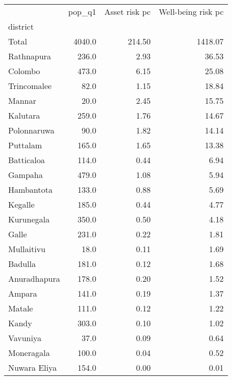 \begin{tabular}{lrrr}
\toprule
{} &  pop\_q1 &  Asset risk pc &  Well-being risk pc \\
district     &         &                &                     \\
\midrule
Total        &  4040.0 &         214.50 &             1418.07 \\
Rathnapura   &   236.0 &           2.93 &               36.53 \\
Colombo      &   473.0 &           6.15 &               25.08 \\
Trincomalee  &    82.0 &           1.15 &               18.84 \\
Mannar       &    20.0 &           2.45 &               15.75 \\
Kalutara     &   259.0 &           1.76 &               14.67 \\
Polonnaruwa  &    90.0 &           1.82 &               14.14 \\
Puttalam     &   165.0 &           1.65 &               13.38 \\
Batticaloa   &   114.0 &           0.44 &                6.94 \\
Gampaha      &   479.0 &           1.08 &                5.94 \\
Hambantota   &   133.0 &           0.88 &                5.69 \\
Kegalle      &   185.0 &           0.44 &                4.77 \\
Kurunegala   &   350.0 &           0.50 &                4.18 \\
Galle        &   231.0 &           0.22 &                1.81 \\
Mullaitivu   &    18.0 &           0.11 &                1.69 \\
Badulla      &   181.0 &           0.12 &                1.68 \\
Anuradhapura &   178.0 &           0.20 &                1.52 \\
Ampara       &   141.0 &           0.19 &                1.37 \\
Matale       &   111.0 &           0.12 &                1.22 \\
Kandy        &   303.0 &           0.10 &                1.02 \\
Vavuniya     &    37.0 &           0.09 &                0.64 \\
Moneragala   &   100.0 &           0.04 &                0.52 \\
Nuwara Eliya &   154.0 &           0.00 &                0.01 \\
\bottomrule
\end{tabular}
